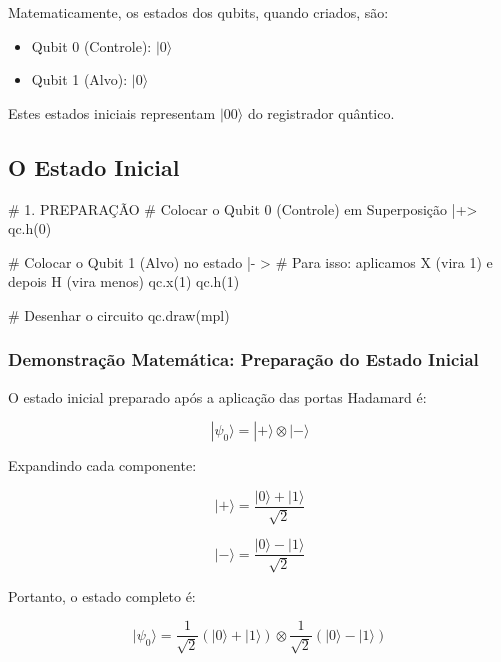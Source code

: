 \documentclass[
  brazilian,
]{report}
\newenvironment{Shaded}{\begin{snugshade}}{\end{snugshade}}
\newcommand{\NormalTok}[1]{\textcolor[rgb]{0.00,0.23,0.31}{#1}}
\providecommand{\tightlist}{%
  \setlength{\itemsep}{0pt}\setlength{\parskip}{0pt}}
\begin{document}
Matematicamente, os estados dos qubits, quando criados, são:

\begin{itemize}
\tightlist
\item
  Qubit 0 (Controle): \(|0\rangle\)
\item
  Qubit 1 (Alvo): \(|0\rangle\)
\end{itemize}

Estes estados iniciais representam \(|00\rangle\) do registrador
quântico.

\subsection{O Estado Inicial}\label{o-estado-inicial}

\begin{Shaded}
\begin{Highlighting}[]


\NormalTok{\# 1. PREPARAÇÃO}
\NormalTok{\# Colocar o Qubit 0 (Controle) em Superposição |+\textgreater{}}
\NormalTok{qc.h(0)}

\NormalTok{\# Colocar o Qubit 1 (Alvo) no estado |{-} \textgreater{} }
\NormalTok{\# Para isso: aplicamos X (vira 1) e depois H (vira menos)}
\NormalTok{qc.x(1)}
\NormalTok{qc.h(1)}

\NormalTok{\# Desenhar o circuito}
\NormalTok{qc.draw(\textquotesingle{}mpl\textquotesingle{})}
\end{Highlighting}
\end{Shaded}

\subsubsection{Demonstração Matemática: Preparação do Estado
Inicial}\label{demonstrauxe7uxe3o-matemuxe1tica-preparauxe7uxe3o-do-estado-inicial}

O estado inicial preparado após a aplicação das portas Hadamard é:

\[|\psi_0\rangle = |+\rangle \otimes |-\rangle\]

Expandindo cada componente:

\[|+\rangle = \frac{|0\rangle + |1\rangle}{\sqrt{2}}\]

\[|-\rangle = \frac{|0\rangle - |1\rangle}{\sqrt{2}}\]

Portanto, o estado completo é:

\[|\psi_0\rangle = \frac{1}{\sqrt{2}}(|0\rangle + |1\rangle) \otimes \frac{1}{\sqrt{2}}(|0\rangle - |1\rangle)\]
\end{document}
